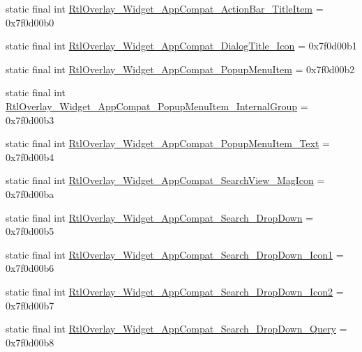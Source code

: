 \begin{DoxyCompactItemize}
static final int \mbox{\hyperlink{classcom_1_1synnapps_1_1carouselview_1_1_r_1_1style_a271738fa338e2eb40778649caf7e44ac}{Rtl\+Overlay\+\_\+\+Widget\+\_\+\+App\+Compat\+\_\+\+Action\+Bar\+\_\+\+Title\+Item}} = 0x7f0d00b0
\item 
static final int \mbox{\hyperlink{classcom_1_1synnapps_1_1carouselview_1_1_r_1_1style_ab15976164173a251956d1691a6328950}{Rtl\+Overlay\+\_\+\+Widget\+\_\+\+App\+Compat\+\_\+\+Dialog\+Title\+\_\+\+Icon}} = 0x7f0d00b1
\item 
static final int \mbox{\hyperlink{classcom_1_1synnapps_1_1carouselview_1_1_r_1_1style_a9a3eb7920b2ea3b5d8aa372000f71db2}{Rtl\+Overlay\+\_\+\+Widget\+\_\+\+App\+Compat\+\_\+\+Popup\+Menu\+Item}} = 0x7f0d00b2
\item 
static final int \mbox{\hyperlink{classcom_1_1synnapps_1_1carouselview_1_1_r_1_1style_acf784c7d9d2963b21a3d901e79cf34be}{Rtl\+Overlay\+\_\+\+Widget\+\_\+\+App\+Compat\+\_\+\+Popup\+Menu\+Item\+\_\+\+Internal\+Group}} = 0x7f0d00b3
\item 
static final int \mbox{\hyperlink{classcom_1_1synnapps_1_1carouselview_1_1_r_1_1style_a573aa0cdc8ac22653c6e9bbd621be8e1}{Rtl\+Overlay\+\_\+\+Widget\+\_\+\+App\+Compat\+\_\+\+Popup\+Menu\+Item\+\_\+\+Text}} = 0x7f0d00b4
\item 
static final int \mbox{\hyperlink{classcom_1_1synnapps_1_1carouselview_1_1_r_1_1style_acbde770e9f08c725229e511cff7ff763}{Rtl\+Overlay\+\_\+\+Widget\+\_\+\+App\+Compat\+\_\+\+Search\+View\+\_\+\+Mag\+Icon}} = 0x7f0d00ba
\item 
static final int \mbox{\hyperlink{classcom_1_1synnapps_1_1carouselview_1_1_r_1_1style_a239257798d7c03d838aab19ef1c3e6ac}{Rtl\+Overlay\+\_\+\+Widget\+\_\+\+App\+Compat\+\_\+\+Search\+\_\+\+Drop\+Down}} = 0x7f0d00b5
\item 
static final int \mbox{\hyperlink{classcom_1_1synnapps_1_1carouselview_1_1_r_1_1style_af842cf2babd30ad071e43ffd8e1cf2d7}{Rtl\+Overlay\+\_\+\+Widget\+\_\+\+App\+Compat\+\_\+\+Search\+\_\+\+Drop\+Down\+\_\+\+Icon1}} = 0x7f0d00b6
\item 
static final int \mbox{\hyperlink{classcom_1_1synnapps_1_1carouselview_1_1_r_1_1style_ad09b1f5b8338711d4a24002a1ea1860e}{Rtl\+Overlay\+\_\+\+Widget\+\_\+\+App\+Compat\+\_\+\+Search\+\_\+\+Drop\+Down\+\_\+\+Icon2}} = 0x7f0d00b7
\item 
static final int \mbox{\hyperlink{classcom_1_1synnapps_1_1carouselview_1_1_r_1_1style_acba990e27ef6b0128e4e2f3fe7fecb60}{Rtl\+Overlay\+\_\+\+Widget\+\_\+\+App\+Compat\+\_\+\+Search\+\_\+\+Drop\+Down\+\_\+\+Query}} = 0x7f0d00b8

\end{DoxyCompactItemize}
